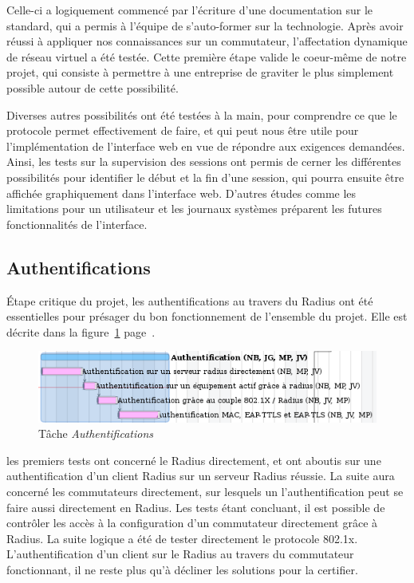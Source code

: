 Celle-ci a logiquement commencé par l'écriture d'une documentation sur le standard, qui a permis à l'équipe de s'auto-former sur la technologie. Après avoir réussi à appliquer nos connaissances sur un commutateur, l'affectation dynamique de réseau virtuel a été testée. Cette première étape valide le coeur-même de notre projet, qui consiste à permettre à une entreprise de graviter le plus simplement possible autour de cette possibilité.

Diverses autres possibilités ont été testées à la main, pour comprendre ce que le protocole permet effectivement de faire, et qui peut nous être utile pour l'implémentation de l'interface web en vue de répondre aux exigences demandées. Ainsi, les tests sur la supervision des sessions ont permis de cerner les différentes possibilités pour identifier le début et la fin d'une session, qui pourra ensuite être affichée graphiquement dans l'interface web. D'autres études comme les limitations pour un utilisateur et les journaux systèmes préparent les futures fonctionnalités de l'interface.

\subsection{Authentifications}

Étape critique du projet, les authentifications au travers du Radius ont été essentielles pour présager du bon fonctionnement de l'ensemble du projet. Elle est décrite dans la figure~\ref{gantt_auth} page~\pageref{gantt_auth}.

\begin{figure}[!h]
	\label{gantt_auth}
	\begin{center}
		\includegraphics[width=350pt]{img/gantt_auth.png}
	\end{center}
	\caption{Tâche \textit{Authentifications}}
\end{figure}

les premiers tests ont concerné le Radius directement, et ont aboutis sur une authentification d'un client Radius sur un serveur Radius réussie. La suite aura concerné les commutateurs directement, sur lesquels un l'authentification peut se faire aussi directement en Radius. Les tests étant concluant, il est possible de contrôler les accès à la configuration d'un commutateur directement grâce à Radius. La suite logique a été de tester directement le protocole 802.1x. L'authentification d'un client sur le Radius au travers du commutateur fonctionnant, il ne reste plus qu'à décliner les solutions pour la certifier.


